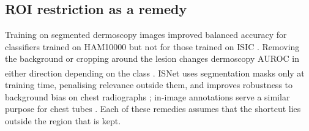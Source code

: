 \documentclass[11pt,a4paper]{article}
\newcommand{\bg}{\textsuperscript{\dag}}
\begin{document}
\subsection{ROI restriction as a remedy}
Training on segmented dermoscopy images improved balanced accuracy for classifiers trained on HAM10000 but not for those
trained on ISIC \citep{maron2021confounding}. Removing the background or cropping around the lesion changes
dermoscopy AUROC in either direction depending on the class \citep{mahbod2020segmentation}\bg. ISNet uses segmentation masks only at training time, penalising relevance
outside them, and improves robustness to background bias on chest radiographs \citep{bassi2024isnet}; in-image
annotations serve a similar purpose for chest tubes \citep{rueckel2021pneumothorax}. Each of these remedies assumes
that the shortcut lies outside the region that is kept.
\end{document}
